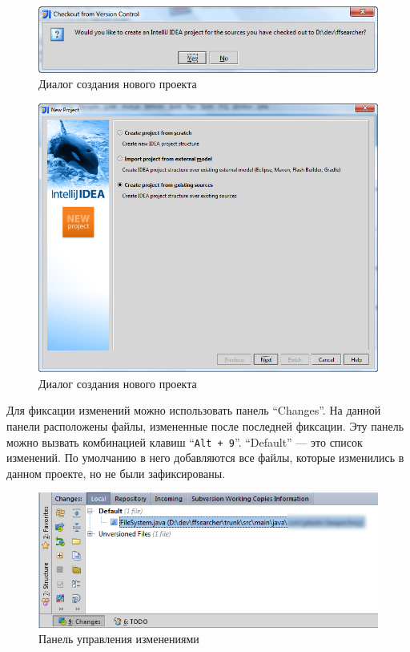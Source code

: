 \documentclass[a4paper,12pt]{article}
\begin{document}
\begin{figure}[h!]
	\centering
	\includegraphics[scale=0.60]{intellij-idea-8.png}
	\vspace{-10pt}
	\caption{Диалог создания нового проекта}
\end{figure}
\vspace{-10pt}
\begin{figure}[h!]
	\centering
	\includegraphics[scale=0.59]{intellij-idea-9.png}
	\vspace{-10pt}
	\caption{Диалог создания нового проекта}
\end{figure}

Для фиксации изменений можно использовать панель ``Changes''. На данной панели
расположены файлы, измененные после последней фиксации. Эту панель можно вызвать
комбинацией клавиш ``\texttt{Alt + 9}''. ``Default'' --- это список изменений.
По умолчанию в него добавляются все файлы, которые изменились в данном проекте, но
не были зафиксированы. 

\begin{figure}[h!]
	\centering
	\includegraphics[scale=0.60]{intellij-idea-14.png}
	\vspace{-10pt}
	\caption{Панель управления изменениями}
\end{figure}
\end{document}
